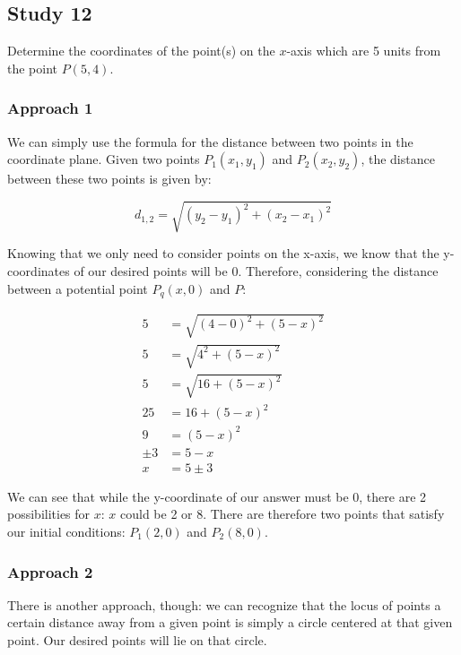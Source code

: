 \documentclass[12pt]{article}
\begin{document}
\newpage

\subsection*{Study 12}

\begin{displayquote}
Determine the coordinates of the point(s) on the $x$-axis which are 5 units from the point $P(5,4)$.
\end{displayquote}

\subsubsection*{Approach 1}

We can simply use the formula for the distance between two points in the coordinate plane. Given two points $P_1(x_1, y_1)$ and $P_2(x_2, y_2)$, the distance between these two points is given by:

\[
d_{1, 2} = \sqrt{(y_2 - y_1)^2 + (x_2 - x_1)^2}
\]

Knowing that we only need to consider points on the x-axis, we know that the y-coordinates of our desired points will be 0. Therefore, considering the distance between a potential point $P_q(x, 0)$ and $P$:

\begin{align*}
    5 &= \sqrt{(4 - 0)^2 + (5 - x)^2}\\
    5 &= \sqrt{4^2 + (5 - x)^2}\\
    5 &= \sqrt{16 + (5 - x)^2}\\
    25 &= 16 + (5 - x)^2\\
    9 &= (5 - x)^2\\
    \pm 3 &= 5 - x\\
    x &= 5 \pm 3
\end{align*}

We can see that while the y-coordinate of our answer must be 0, there are 2 possibilities for $x$: $x$ could be 2 or 8.
There are therefore two points that satisfy our initial conditions: $P_1(2, 0)$ and $P_2(8, 0)$.

\subsubsection*{Approach 2}

There is another approach, though: we can recognize that the locus of points a certain distance away from a given point is simply a circle centered at that given point. Our desired points will lie on that circle.
\end{document}
